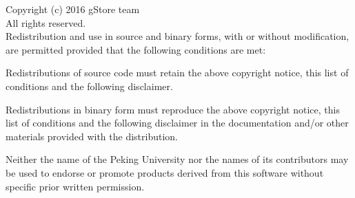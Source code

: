\documentclass[titlepage, a4paper, 12pt]{article}
\begin{document}
\clearpage




Copyright (c) 2016 gStore team \\
All rights reserved. \\

Redistribution and use in source and binary forms, with or without modification, are permitted provided that the following conditions are met:

Redistributions of source code must retain the above copyright notice, this list of conditions and the following disclaimer.

Redistributions in binary form must reproduce the above copyright notice, this list of conditions and the following disclaimer in the documentation and/or other materials provided with the distribution.

Neither the name of the Peking University nor the names of its contributors may be used to endorse or promote products derived from this software without specific prior written permission. \\
\end{document}
